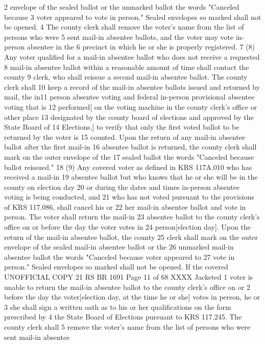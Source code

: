 2 envelope of the sealed ballot or the unmarked ballot the words "Canceled because
3 voter appeared to vote in person." Sealed envelopes so marked shall not be opened.
4 The county clerk shall remove the voter's name from the list of persons who were
5 sent mail-in absentee ballots, and the voter may vote in-person absentee in the
6 precinct in which he or she is properly registered.
7 (8) Any voter qualified for a mail-in absentee ballot who does not receive a requested
8 mail-in absentee ballot within a reasonable amount of time shall contact the county
9 clerk, who shall reissue a second mail-in absentee ballot. The county clerk shall
10 keep a record of the mail-in absentee ballots issued and returned by mail, the in11 person absentee voting and federal in-person provisional absentee voting that is
12 performed[ on the voting machine in the county clerk's office or other place
13 designated by the county board of elections and approved by the State Board of
14 Elections,] to verify that only the first voted ballot to be returned by the voter is
15 counted. Upon the return of any mail-in absentee ballot after the first mail-in
16 absentee ballot is returned, the county clerk shall mark on the outer envelope of the
17 sealed ballot the words "Canceled because ballot reissued."
18 (9) Any covered voter as defined in KRS 117A.010 who has received a mail-in
19 absentee ballot but who knows that he or she will be in the county on election day
20 or during the dates and times in-person absentee voting is being conducted, and
21 who has not voted pursuant to the provisions of KRS 117.086, shall cancel his or
22 her mail-in absentee ballot and vote in person. The voter shall return the mail-in
23 absentee ballot to the county clerk's office on or before the day the voter votes in
24 person[election day]. Upon the return of the mail-in absentee ballot, the county
25 clerk shall mark on the outer envelope of the sealed mail-in absentee ballot or the
26 unmarked mail-in absentee ballot the words "Canceled because voter appeared to
27 vote in person." Sealed envelopes so marked shall not be opened. If the covered 
UNOFFICIAL COPY 21 RS BR 1691
Page 11 of 68
XXXX Jacketed
1 voter is unable to return the mail-in absentee ballot to the county clerk's office on or
2 before the day the voter[election day, at the time he or she] votes in person, he or
3 she shall sign a written oath as to his or her qualifications on the form prescribed by
4 the State Board of Elections pursuant to KRS 117.245. The county clerk shall
5 remove the voter's name from the list of persons who were sent mail-in absentee
